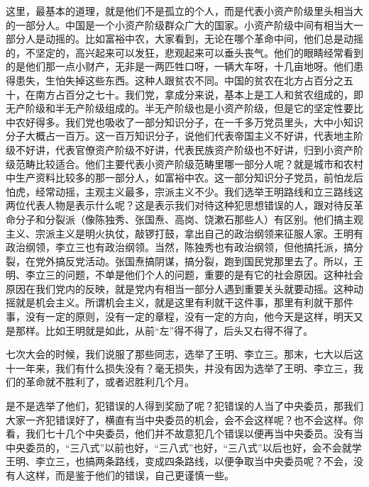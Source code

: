 这里，最基本的道理，就是他们不是孤立的个人，而是代表小资产阶级里头相当大的一部分人。中国是一个小资产阶级群众广大的国家。小资产阶级中间有相当大一部分人是动摇的。比如富裕中农，大家看到，无论在哪个革命中间，他们总是动摇的，不坚定的，高兴起来可以发狂，悲观起来可以垂头丧气。他们的眼睛经常看到的是他们那一点小财产，无非是一两匹牲口呀，一辆大车呀，十几亩地呀。他们患得患失，生怕失掉这些东西。这种人跟贫农不同。中国的贫农在北方占百分之五十，在南方占百分之七十。我们党，拿成分来说，基本上是工人和贫农组成的，即无产阶级和半无产阶级组成的。半无产阶级也是小资产阶级，但是它的坚定性要比中农好得多。我们党也吸收了一部分知识分子，在一千多万党员里头，大中小知识分子大概占一百万。这一百万知识分子，说他们代表帝国主义不好讲，代表地主阶级不好讲，代表官僚资产阶级不好讲，代表民族资产阶级也不好讲，归到小资产阶级范畴比较适合。他们主要代表小资产阶级范畴里哪一部分人呢？就是城市和农村中生产资料比较多的那一部分人，如富裕中农。这一部分知识分子党员，前怕龙后怕虎，经常动摇，主观主义最多，宗派主义不少。我们选举王明路线和立三路线这两位代表人物是表示什么呢？这是表示我们对待这种犯思想错误的人，跟对待反革命分子和分裂派（像陈独秀、张国焘、高岗、饶漱石那些人）有区别。他们搞主观主义、宗派主义是明火执仗，敲锣打鼓，拿出自己的政治纲领来征服人家。王明有政治纲领，李立三也有政治纲领。当然，陈独秀也有政治纲领，但他搞托派，搞分裂，在党外搞反党活动。张国焘搞阴谋，搞分裂，跑到国民党那里去了。所以，王明、李立三的问题，不单是他们个人的问题，重要的是有它的社会原因。这种社会原因在我们党内的反映，就是党内有相当一部分人遇到重要关头就要动摇。这种动摇就是机会主义。所谓机会主义，就是这里有利就干这件事，那里有利就干那件事，没有一定的原则，没有一定的章程，没有一定的方向，他今天是这样，明天又是那样。比如王明就是如此，从前“左”得不得了，后头又右得不得了。

七次大会的时候，我们说服了那些同志，选举了王明、李立三。那末，七大以后这十一年来，我们有什么损失没有？毫无损失，并没有因为选举了王明、李立三，我们的革命就不胜利了，或者迟胜利几个月。

是不是选举了他们，犯错误的人得到奖励了呢？犯错误的人当了中央委员，那我们大家一齐犯错误好了，横直有当中央委员的机会，会不会这样呢？也不会这样。你看，我们七十几个中央委员，他们并不故意犯几个错误以便再当中央委员。没有当中央委员的，“三八式”以前也好，“三八式”也好，“三八式”以后也好，会不会就学王明、李立三，也搞两条路线，变成四条路线，以便争取当中央委员呢？不会，没有人这样，而是鉴于他们的错误，自己更谨慎一些。

